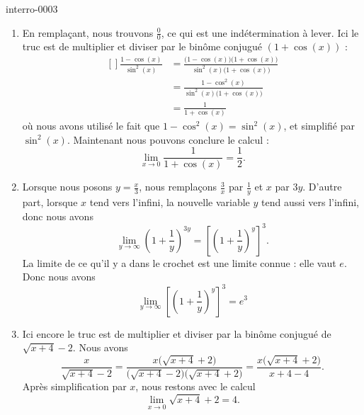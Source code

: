 \begin{corrige}{interro-0003}
\begin{enumerate}
		\item
			En remplaçant, nous trouvons $\frac{ 0 }{ 0 }$, ce qui est une indétermination à lever. Ici le truc est de multiplier et diviser par le binôme conjugué $(1+\cos(x))$ :
			\begin{equation}
				\begin{aligned}[]
					\frac{ 1-\cos(x) }{ \sin^2(x) }&=\frac{ \big( 1-\cos(x) \big)\big( 1+\cos(x) \big) }{ \sin^2(x)\big( 1+\cos(x) \big) }\\
					&=\frac{ 1-\cos^2(x) }{ \sin^2(x)\big( 1+\cos(x) \big) }\\
					&=\frac{1}{ 1+\cos(x) }
				\end{aligned}
			\end{equation}
			où nous avons utilisé le fait que $1-\cos^2(x)=\sin^2(x)$, et simplifié par $\sin^2(x)$. Maintenant nous pouvons conclure le calcul :
			\begin{equation}
				\lim_{x\to 0} \frac{1}{ 1+\cos(x) }=\frac{ 1 }{2}.
			\end{equation}
		\item

			Lorsque nous posons $y=\frac{ x }{ 3 }$, nous remplaçons $\frac{ 3 }{ x }$ par $\frac{1}{ y }$ et $x$ par $3y$. D'autre part, lorsque $x$ tend vers l'infini, la nouvelle variable $y$ tend aussi vers l'infini, donc nous avons
			\begin{equation}
				\lim_{y\to \infty} \left( 1+\frac{ 1 }{ y } \right)^{3y}=\left[ \left( 1+\frac{1}{ y } \right)^y \right]^3.
			\end{equation}
			La limite de ce qu'il y a dans le crochet est une limite connue : elle vaut $e$. Donc nous avons
			\begin{equation}
				\lim_{y\to \infty} \left[ \left( 1+\frac{1}{ y } \right)^y \right]^3=e^3
			\end{equation}
		\item
			Ici encore le truc est de multiplier et diviser par la binôme conjugué de $\sqrt{x+4}-2$. Nous avons
			\begin{equation}
				\frac{ x }{ \sqrt{x+4}-2 }=\frac{ x\big( \sqrt{x+4}+2 \big) }{\big(  \sqrt{x+4}-2  \big)\big(  \sqrt{x+4}+2 \big)  }
				=\frac{ x\big(  \sqrt{x+4}+2  \big) }{ x+4-4 }.
			\end{equation}
			Après simplification par $x$, nous restons avec le calcul
			\begin{equation}
				\lim_{x\to 0} \sqrt{x+4}+2=4.
			\end{equation}
			
	\end{enumerate}

\end{corrige}
